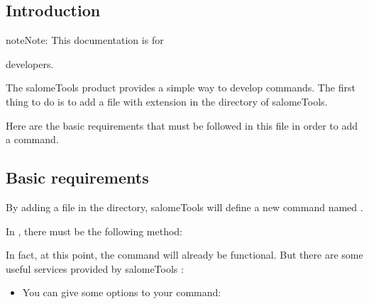 \documentclass[a4paper,10pt,english]{sphinxmanual}
\begin{document}
\subsection{Introduction}
\label{\detokenize{write_command:introduction}}
\begin{sphinxadmonition}{note}{Note:}
This documentation is for %
\begin{footnote}[22]\sphinxAtStartFootnote
{}
%
\end{footnote} developers.
\end{sphinxadmonition}

The salomeTools product provides a simple way to develop commands.
The first thing to do is to add a file with  extension in the  directory of salomeTools.

Here are the basic requirements that must be followed in this file in order to add a command.


\subsection{Basic requirements}
\label{\detokenize{write_command:basic-requirements}}
By adding a file  in the  directory, salomeTools will define a new command named .

In , there must be the following method:

%
\begin{sphinxVerbatim}[commandchars=\\\{\}]
   
\end{sphinxVerbatim}

In fact, at this point, the command will already be functional.
But there are some useful services provided by salomeTools :
\begin{itemize}
\item {} 
You can give some options to your command:

\end{itemize}
\end{document}
